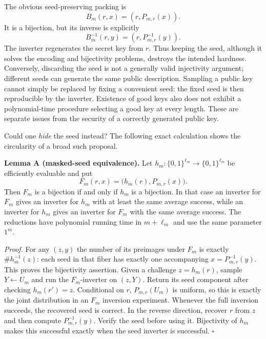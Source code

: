 \documentclass[11pt,a4paper]{article}
\numberwithin{equation}{section}
\begin{document}
The obvious seed-preserving packing is
\begin{equation}\label{eq:50:seed}
 B_m(r,x)=(r,P_{m,r}(x)).
\end{equation}
It is a bijection, but its inverse is explicitly
\[
 B_m^{-1}(r,y)=(r,P_{m,r}^{-1}(y)).
\]
The inverter regenerates the secret key from $r$. Thus keeping the seed,
although it solves the encoding and bijectivity problems, destroys the
intended hardness. Conversely, discarding the seed is not a generally
valid injectivity argument; different seeds can generate the same public
description. Sampling a public key cannot simply be replaced by fixing a
convenient seed: the fixed seed is then reproducible by the inverter.
Existence of good keys also does not exhibit a polynomial-time procedure
selecting a good key at every length. These are separate issues from the
security of a correctly generated public key.

Could one \emph{hide} the seed instead? The following exact calculation
shows the circularity of a broad such proposal.

\textbf{Lemma A (masked-seed equivalence).}
Let $h_m:\{0,1\}^{\ell_m}\to\{0,1\}^{\ell_m}$ be efficiently evaluable and put
\begin{equation}\label{eq:50:masked}
 F_m(r,x)=\bigl(h_m(r),P_{m,r}(x)\bigr).
\end{equation}
Then $F_m$ is a bijection if and only if $h_m$ is a bijection. In that
case an inverter for $F_m$ gives an inverter for $h_m$ with at least the
same average success, while an inverter for $h_m$ gives an inverter for
$F_m$ with the same average success. The reductions have polynomial
running time in $m+\ell_m$ and use the same parameter $1^m$.

\textit{Proof.}
For any $(z,y)$ the number of its preimages under $F_m$ is exactly
$\#h_m^{-1}(z)$: each seed in that fiber has exactly one accompanying
$x=P_{m,r}^{-1}(y)$. This proves the bijectivity assertion.
Given a challenge $z=h_m(r)$, sample $Y\leftarrow U_m$ and run the
$F_m$-inverter on $(z,Y)$. Return its seed component after checking
$h_m(r')=z$. Conditional on $r$, $P_{m,r}(U_m)$ is uniform, so this is
exactly the joint distribution in an $F_m$ inversion experiment.
Whenever the full inversion succeeds, the recovered seed is correct.
In the reverse direction, recover $r$ from $z$ and then compute
$P_{m,r}^{-1}(y)$. Verify the seed before using it. Bijectivity of $h_m$
makes this successful exactly when the seed inverter is successful.
\hfill$\square$
\end{document}

